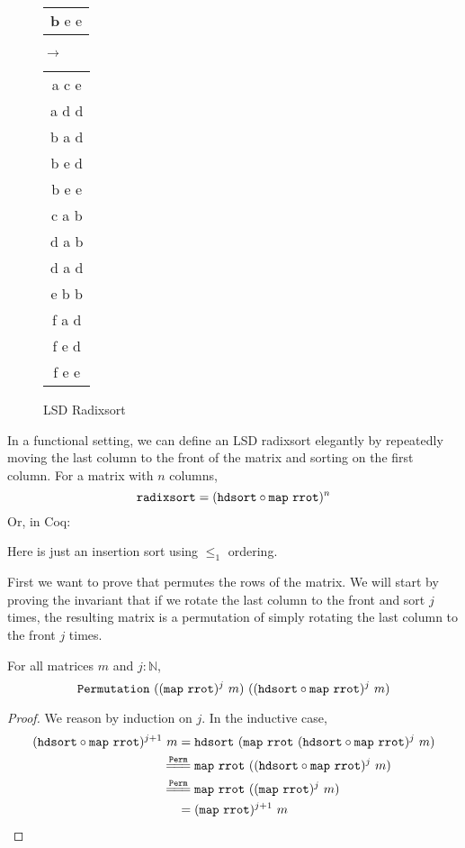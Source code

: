 \documentclass[sigplan,10pt,anonymous,review]{thesis}
\begin{document}
\begin{figure}[!hb]
\begin{tt}
\begin{tabular}{c}
      \textbf{b} e e
    \end{tabular}
    $\rightarrow$
    \begin{tabular}{c}
      a c e \\
      a d d \\
      b a d \\
      b e d \\
      b e e \\
      c a b \\
      d a b \\
      d a d \\
      e b b \\
      f a d \\
      f e d \\
      f e e
    \end{tabular}
  \end{tt}
  \caption{LSD Radixsort}
  \label{fig:lsd_radixsort}
\end{figure}

In a functional setting, we can define an LSD radixsort elegantly by
repeatedly moving the last column to the front of the matrix and
sorting on the first column. For a matrix with $n$ columns,
\begin{equation*}
  \texttt{radixsort} = (\texttt{hdsort} \circ \texttt{map}~\texttt{rrot})^n
\end{equation*}
Or, in Coq:

Here  is just an insertion sort using $\le_1$ ordering.

First we want to prove that  permutes the rows of the
matrix. We will start by proving the invariant that if we rotate the
last column to the front and sort $j$ times, the resulting matrix is a
permutation of simply rotating the last column to the front $j$
times.
\begin{lemma}
  For all matrices $m$ and $j : \mathbb{N}$,
  \begin{equation*}
    \texttt{Permutation}~((\texttt{map}~\texttt{rrot})^j~m)~
                      ((\texttt{hdsort} \circ \texttt{map}~\texttt{rrot})^j~m)
  \end{equation*}
\end{lemma}
\begin{proof}
  We reason by induction on $j$. In the inductive case,
  \begin{align*}
    (\var{hdsort} \comp \var{map}~\var{rrot})^{j+1}~m ={}&
    \var{hdsort}~(\var{map}~\var{rrot}~(\var{hdsort} \comp
    \var{map}~\var{rrot})^j~m) \\
    \eqperm{}& \var{map}~\var{rrot}~((\var{hdsort} \comp
    \var{map}~\var{rrot})^j~m) \\
    \eqperm{}& \var{map}~\var{rrot}~((\var{map}~\var{rrot})^j~m) \\
    ={}& (\var{map}~\var{rrot})^{j+1}~m \qedhere
  \end{align*}
\end{proof}
\end{document}
